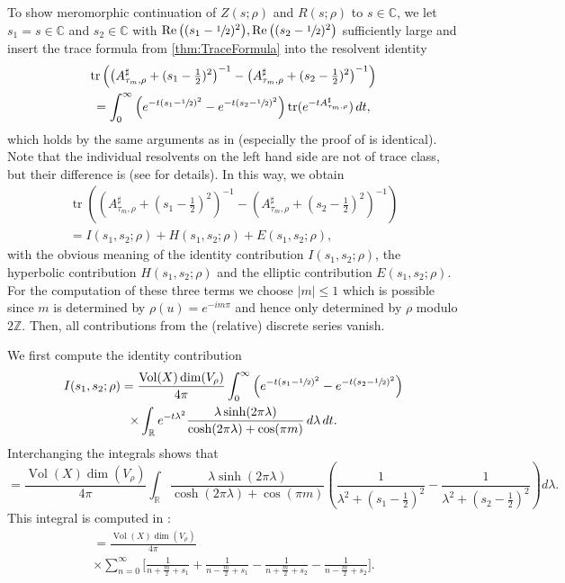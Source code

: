 \documentclass[JEP,XML,SOM,Unicode,NoFloatCountersInSection,published]{cedram}
\theoremstyle{plain}
\theoremstyle{definition}
\theoremstyle{remark}
\newcommand{\R}{\mathbb{R}}
\newcommand{\Z}{\mathbb{Z}}
\newcommand{\C}{\mathbb{C}}
\DeclareMathOperator{\RE}{Re}
\DeclareMathOperator{\tr}{tr}
\DeclareMathOperator{\Vol}{Vol}
\numberwithin{equation}{section}
\begin{document}
To show meromorphic continuation of $Z(s;\rho)$ and $R(s;\rho)$ to $s\in\C$, we let \hbox{$s_1=s\in\C$} and $s_2\in\C$ with $\RE\big((s_1-\sfrac{1}{2})^2\big),\RE\big((s_2-\sfrac{1}{2})^2\big)$ sufficiently large and insert the trace formula from \cref{thm:TraceFormula} into the resolvent identity
\begin{multline*}
\tr\left(\left(A_{\tau_m,\rho}^\sharp+(s_1-\tfrac{1}{2})^2\right)^{-1}-\left(A_{\tau_m,\rho}^\sharp+(s_2-\tfrac{1}{2})^2\right)^{-1}\right)\\
= \int_0^\infty \left(e^{-t(s_1-\sfrac{1}{2})^2}-e^{-t(s_2-\sfrac{1}{2})^2}\right)\tr(e^{-tA_{\tau_m,\rho}^\sharp})\,dt,
\end{multline*}
which holds by the same arguments as in \cite[\S 4.2]{FS} (especially the proof of \cite[Lem.\,4.2.2]{FS} is identical). Note that the individual resolvents on the left hand side are not of trace class, but their difference is (see \cite[p.\,51]{FS} for details). In this way, we obtain
\begin{multline}
\tr\left(\left(A_{\tau_m,\rho}^\sharp+(s_1-\tfrac{1}{2})^2\right)^{-1}-\left(A_{\tau_m,\rho}^\sharp+(s_2-\tfrac{1}{2})^2\right)^{-1}\right)\\
= I(s_1,s_2;\rho)+H(s_1,s_2;\rho)+E(s_1,s_2;\rho)\label{eq:ResolventIdentityWithIdHypEllContributions},
\end{multline}
with the obvious meaning of the identity contribution $I(s_1,s_2;\rho)$, the hyperbolic contribution $H(s_1,s_2;\rho)$ and the elliptic contribution $E(s_1,s_2;\rho)$. For the computation of these three terms we choose $|m|\leq1$ which is possible since $m$ is determined by $\rho(u)=e^{-im\pi}$ and hence only determined by $\rho$ modulo $2\Z$. Then, all contributions from the (relative) discrete series vanish.

We first compute the identity contribution\vspace*{-3pt}
\begin{multline}
I(s_1,s_2;\rho) = \frac{\Vol(X)\dim(V_\rho)}{4\pi}\int_0^\infty\left(e^{-t(s_1-\sfrac{1}{2})^2}-e^{-t(s_2-\sfrac{1}{2})^2}\right)\\
\times\int_\R e^{-t\lambda^2}\frac{\lambda\sinh(2\pi\lambda)}{\cosh(2\pi\lambda)+\cos(\pi m)}\,d\lambda\,dt.
\end{multline}
Interchanging the integrals shows that\vspace*{-3pt}
\begin{equation*}
= \frac{\Vol(X)\dim(V_\rho)}{4\pi}\!\int_\R\!\frac{\lambda\sinh(2\pi\lambda)}{\cosh(2\pi\lambda)+\cos(\pi m)}\left(\frac{1}{\lambda^2+(s_1-\tfrac{1}{2})^2}-\frac{1}{\lambda^2+(s_2-\tfrac{1}{2})^2}\right)d\lambda.
\end{equation*}
This integral is computed in \cite[Ch.\,10, Lem.\,2.4]{He2}:
\begin{multline}
= \frac{\Vol(X)\dim(V_\rho)}{4\pi}\\[-5pt]
\times\sum_{n=0}^\infty\bigg[\frac{1}{n+\frac{m}{2}+s_1}+\frac{1}{n-\frac{m}{2}+s_1}-\frac{1}{n+\frac{m}{2}+s_2}-\frac{1}{n-\frac{m}{2}+s_2}\bigg]\label{eq:IdentityFinal}.
\end{multline}
\end{document}
